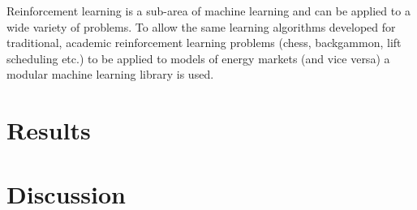 Reinforcement learning is a sub-area of machine learning and can be applied to
a wide variety of problems.  To allow the same
learning algorithms developed for traditional, academic reinforcement learning
problems (chess, backgammon, lift scheduling etc.) to be applied to models of
energy markets (and vice versa) a modular machine learning library is used.

\chapter{Results}

\chapter{Discussion}

